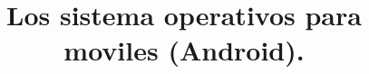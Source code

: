 \documentclass{bmcart}
\begin{document}
\begin{frontmatter}

\begin{fmbox}


\title{Los sistema operativos para moviles (Android).}








\begin{artnotes}
\end{artnotes}

\end{fmbox}%



\end{frontmatter}
\end{document}
